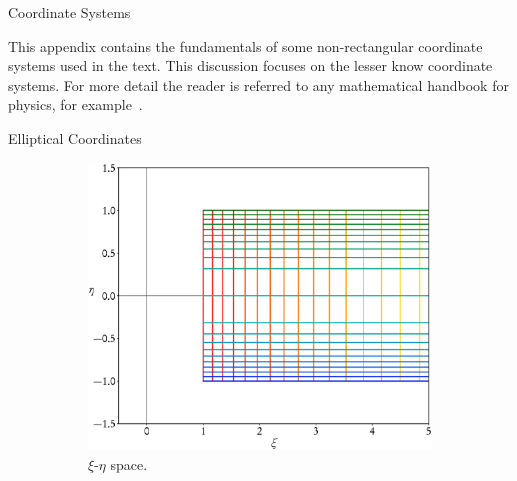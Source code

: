 \documentclass[letterpaper, 11 pt]{report}
\begin{document}
\begin{appendices}

   \begin{chapter}{Coordinate Systems \label{chap:coords}}

      This appendix contains the fundamentals of some non-rectangular coordinate systems used in the
      text. This discussion focuses on the lesser know coordinate systems. For more detail the reader
      is referred to any mathematical handbook for physics, for example~\cite{coord1, coord2}.

      \begin{section}{Elliptical Coordinates \label{sec:elliptic}}

         \begin{figure}[t]
            \centering
            \begin{subfigure}{.5\textwidth}
               \centering
               \includegraphics[width=\linewidth]{./images/appendix/xieta.eps}
               \caption{$\xi$-$\eta$ space. \label{fig:xieta}}
            \end{subfigure}%
            \begin{subfigure}{.5\textwidth}
               \centering

\end{subfigure}
\end{figure}
\end{section}
\end{chapter}
\end{appendices}
\end{document}
